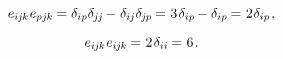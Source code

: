 \begin{otherlanguage}{russian}
\nopagebreak\vspace{-0.15em}\begin{equation*}
e_{i\hspace{-0.1ex}j\hspace{-0.1ex}k} \hspace{.1ex} e_{pj\hspace{-0.1ex}k} \hspace{-0.15ex}
= \delta_{ip} \delta_{\hspace{-0.1ex}j\hspace{-0.12ex}j} \hspace{-0.2ex} - \hspace{.1ex} \delta_{i\hspace{-0.1ex}j} \delta_{\hspace{-0.1ex}j\hspace{-0.1ex}p} \hspace{-0.15ex}
= \hspace{.1ex} 3 \hspace{.2ex} \delta_{ip} \hspace{-0.2ex} - \delta_{ip} \hspace{-0.15ex}
= \hspace{.1ex} 2 \hspace{.1ex} \delta_{ip}
\hspace{.2ex} ,
\end{equation*}

\nopagebreak\vspace{-0.15em}\begin{equation*}
e_{i\hspace{-0.1ex}j\hspace{-0.1ex}k} \hspace{.1ex} e_{i\hspace{-0.1ex}j\hspace{-0.1ex}k} \hspace{-0.15ex}
= \hspace{.1ex} 2 \hspace{.2ex} \delta_{ii} \hspace{-0.15ex}
= \hspace{.1ex} 6
\hspace{.2ex} .
\end{equation*}

\vspace{-0.33em}\noindent
{} 


\end{otherlanguage}
